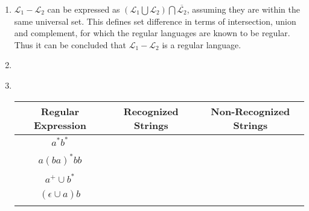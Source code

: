 \documentclass[a4paper, 12pt]{article}
\begin{document}
\begin{enumerate}
\begin{figure}[H]
\end{figure}

\item %
$\mathscr{L}_{1} - \mathscr{L}_{2}$ can be expressed as $(\mathscr{L}_{1} \bigcup \mathscr{L}_2) \bigcap \overline{\mathscr{L}_{2}}$, assuming they are within the same universal set. This defines set difference in terms of intersection, union and complement, for which the regular languages are known to be regular. Thus it can be concluded that $\mathscr{L}_{1}  - \mathscr{L}_{2}$ is a regular language.  




\item %

\item ~\\%
\begin{center}
	\begin{tabular}{|c|c|c|}
	\hline
	\textbf{Regular Expression} & \textbf{Recognized Strings} & \textbf{Non-Recognized Strings}\\
	\hline
	$a^*b^*$ & &\\
	\cline{2-3}
	& &\\
	\hline
	$a(ba)^*bb$ & &\\
	\cline{2-3}
	& &\\
	\hline
	$a^+ \cup b^*$ & &\\
	\cline{2-3}
	& &\\
	\hline
	$(\epsilon \cup a)b$ & &\\
	\cline{2-3}
	& &\\
	\hline
	\end{tabular}
\end{center}
\end{enumerate}


\end{document}
